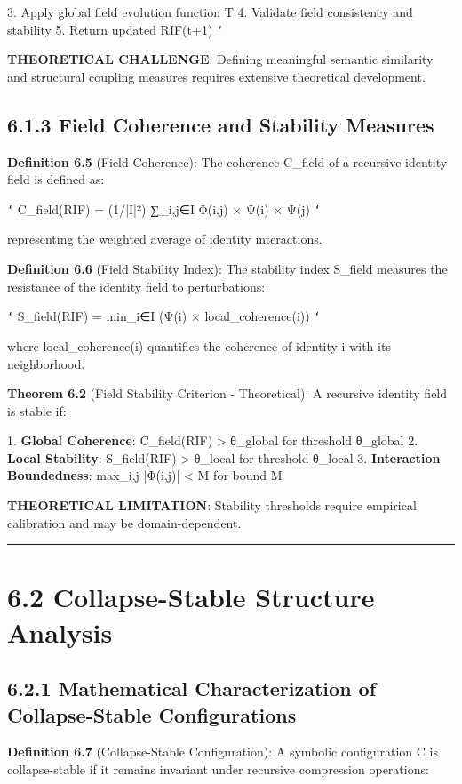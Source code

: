 3. Apply global field evolution function T
4. Validate field consistency and stability
5. Return updated RIF(t+1)
\texttt{`}

\textbf{THEORETICAL CHALLENGE}: Defining meaningful semantic similarity and structural coupling measures requires extensive theoretical development.

\subsection{6.1.3 Field Coherence and Stability Measures}

\textbf{Definition 6.5} (Field Coherence): The coherence C_field of a recursive identity field is defined as:

\texttt{`}
C_field(RIF) = (1/|I|²) ∑_{i,j∈I} Φ(i,j) × Ψ(i) × Ψ(j)
\texttt{`}

representing the weighted average of identity interactions.

\textbf{Definition 6.6} (Field Stability Index): The stability index S_field measures the resistance of the identity field to perturbations:

\texttt{`}
S_field(RIF) = min_{i∈I} (Ψ(i) × local_coherence(i))
\texttt{`}

where local_coherence(i) quantifies the coherence of identity i with its neighborhood.

\textbf{Theorem 6.2} (Field Stability Criterion - Theoretical): A recursive identity field is stable if:

1. \textbf{Global Coherence}: C_field(RIF) > θ_global for threshold θ_global
2. \textbf{Local Stability}: S_field(RIF) > θ_local for threshold θ_local  
3. \textbf{Interaction Boundedness}: max_{i,j} |Φ(i,j)| < M for bound M

\textbf{THEORETICAL LIMITATION}: Stability thresholds require empirical calibration and may be domain-dependent.

\hrule

\section{6.2 Collapse-Stable Structure Analysis}

\subsection{6.2.1 Mathematical Characterization of Collapse-Stable Configurations}

\textbf{Definition 6.7} (Collapse-Stable Configuration): A symbolic configuration C is collapse-stable if it remains invariant under recursive compression operations:

